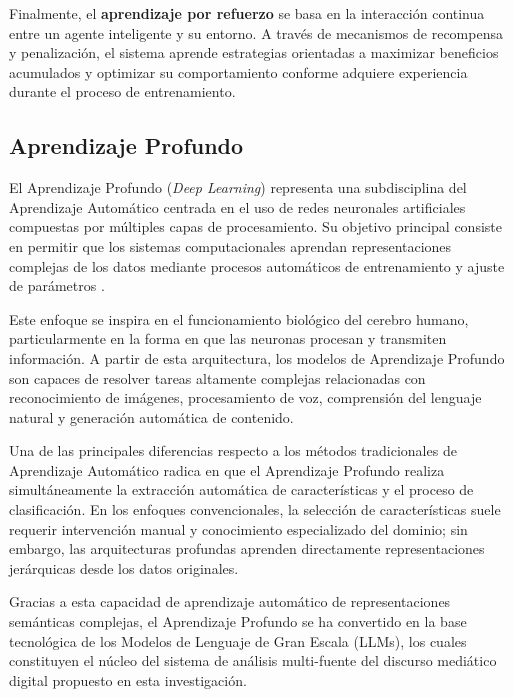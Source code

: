 Finalmente, el \textbf{aprendizaje por refuerzo} se basa en la interacción continua entre un agente inteligente y su entorno. A través de mecanismos de recompensa y penalización, el sistema aprende estrategias orientadas a maximizar beneficios acumulados y optimizar su comportamiento conforme adquiere experiencia durante el proceso de entrenamiento.

\subsection{Aprendizaje Profundo}

El Aprendizaje Profundo (\textit{Deep Learning}) representa una subdisciplina del Aprendizaje Automático centrada en el uso de redes neuronales artificiales compuestas por múltiples capas de procesamiento. Su objetivo principal consiste en permitir que los sistemas computacionales aprendan representaciones complejas de los datos mediante procesos automáticos de entrenamiento y ajuste de parámetros \parencite{gl_sas_deeplearning}.

Este enfoque se inspira en el funcionamiento biológico del cerebro humano, particularmente en la forma en que las neuronas procesan y transmiten información. A partir de esta arquitectura, los modelos de Aprendizaje Profundo son capaces de resolver tareas altamente complejas relacionadas con reconocimiento de imágenes, procesamiento de voz, comprensión del lenguaje natural y generación automática de contenido.

Una de las principales diferencias respecto a los métodos tradicionales de Aprendizaje Automático radica en que el Aprendizaje Profundo realiza simultáneamente la extracción automática de características y el proceso de clasificación. En los enfoques convencionales, la selección de características suele requerir intervención manual y conocimiento especializado del dominio; sin embargo, las arquitecturas profundas aprenden directamente representaciones jerárquicas desde los datos originales.

Gracias a esta capacidad de aprendizaje automático de representaciones semánticas complejas, el Aprendizaje Profundo se ha convertido en la base tecnológica de los Modelos de Lenguaje de Gran Escala (LLMs), los cuales constituyen el núcleo del sistema de análisis multi-fuente del discurso mediático digital propuesto en esta investigación.

